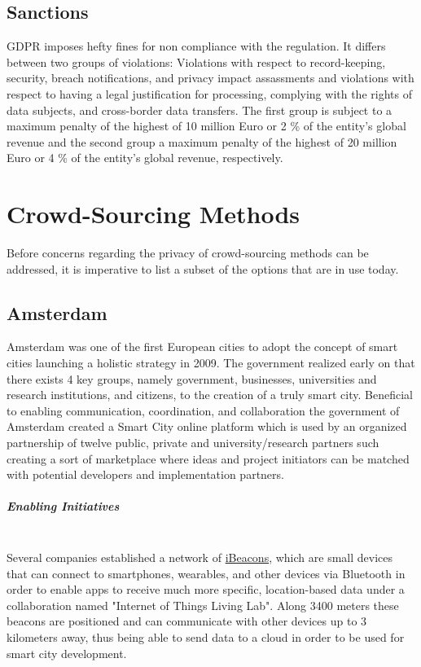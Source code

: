 \documentclass[a4paper,12pt]{report}
\begin{document}
	\section{Sanctions}
	\startsection
	GDPR imposes hefty fines for non compliance with the regulation.
	It differs between two groups of violations: Violations with respect to record-keeping, security, breach notifications, and privacy impact assassments and violations with respect to having a legal justification for processing, complying with the rights of data subjects, and cross-border data transfers.
	The first group is subject to a maximum penalty of the highest of 10 million Euro or 2 \% of the entity's global revenue and the second group a maximum penalty of the highest of 20 million Euro or 4 \% of the entity's global revenue, respectively.
	\closesection
	
	
	\chapter{Crowd-Sourcing Methods} \label{Crowd-Sourcing Methods}
	Before concerns regarding the privacy of crowd-sourcing methods can be addressed, it is imperative to list a subset of the options that are in use today.
	
	\section[Amsterdam]{Amsterdam \cite{SmartCityAmsterdam}} \label{Amsterdam}
	\startsection
		Amsterdam was one of the first European cities to adopt the concept of smart cities launching a holistic strategy in 2009. The government realized early on that there exists 4 key groups, namely government, businesses, universities and research institutions, and citizens, to the creation of a truly smart city. Beneficial to enabling communication, coordination, and collaboration the government of Amsterdam created a Smart City online platform which is used by an organized partnership of twelve public, private and university/research partners such creating a sort of marketplace where ideas and project initiators can be matched with potential developers and implementation partners.
		\paragraph{Enabling Initiatives} \hfill \\
		Several companies established a network of \href{https://www.yenlo.com/blogs/ibeacon-testing-ground-first-lora-network/}{iBeacons}, which are small devices that can connect to smartphones, wearables, and other devices via Bluetooth in order to enable apps to receive much more specific, location-based data under a collaboration named "Internet of Things Living Lab". Along 3400 meters these beacons are positioned and can communicate with other devices up to 3 kilometers away, thus being able to send data to a cloud in order to be used for smart city development.
\end{document}

